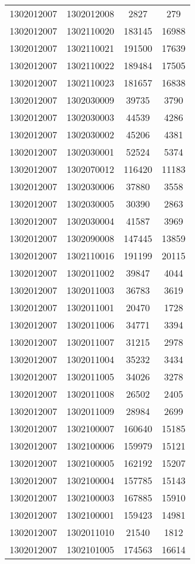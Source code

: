 \begin{longtable}[h]{llcc}
		1302012007 & 1302012008 & 2827 & 279\\
		1302012007 & 1302110020 & 183145 & 16988\\
		1302012007 & 1302110021 & 191500 & 17639\\
		1302012007 & 1302110022 & 189484 & 17505\\
		1302012007 & 1302110023 & 181657 & 16838\\
		1302012007 & 1302030009 & 39735 & 3790\\
		1302012007 & 1302030003 & 44539 & 4286\\
		1302012007 & 1302030002 & 45206 & 4381\\
		1302012007 & 1302030001 & 52524 & 5374\\
		1302012007 & 1302070012 & 116420 & 11183\\
		1302012007 & 1302030006 & 37880 & 3558\\
		1302012007 & 1302030005 & 30390 & 2863\\
		1302012007 & 1302030004 & 41587 & 3969\\
		1302012007 & 1302090008 & 147445 & 13859\\
		1302012007 & 1302110016 & 191199 & 20115\\
		1302012007 & 1302011002 & 39847 & 4044\\
		1302012007 & 1302011003 & 36783 & 3619\\
		1302012007 & 1302011001 & 20470 & 1728\\
		1302012007 & 1302011006 & 34771 & 3394\\
		1302012007 & 1302011007 & 31215 & 2978\\
		1302012007 & 1302011004 & 35232 & 3434\\
		1302012007 & 1302011005 & 34026 & 3278\\
		1302012007 & 1302011008 & 26502 & 2405\\
		1302012007 & 1302011009 & 28984 & 2699\\
		1302012007 & 1302100007 & 160640 & 15185\\
		1302012007 & 1302100006 & 159979 & 15121\\
		1302012007 & 1302100005 & 162192 & 15207\\
		1302012007 & 1302100004 & 157785 & 15143\\
		1302012007 & 1302100003 & 167885 & 15910\\
		1302012007 & 1302100001 & 159423 & 14981\\
		1302012007 & 1302011010 & 21540 & 1812\\
		1302012007 & 1302101005 & 174563 & 16614\\

\end{longtable}
